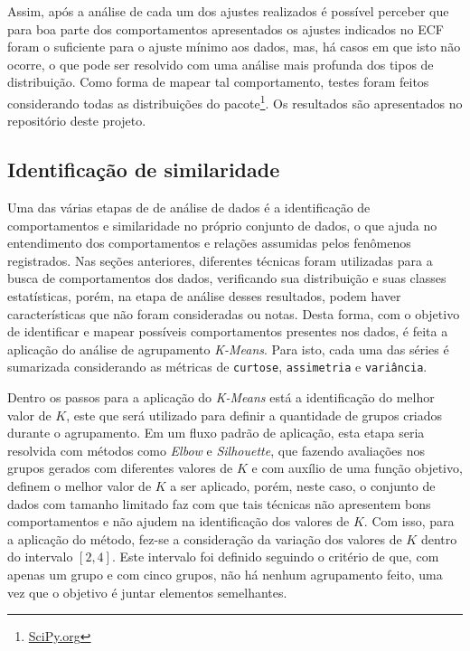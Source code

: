 \documentclass[a4paper,12pt]{article}
\begin{document}
\par Assim, após a análise de cada um dos ajustes realizados é possível perceber que para boa parte dos comportamentos apresentados os ajustes indicados no ECF foram o suficiente para o ajuste mínimo aos dados, mas, há casos em que isto não ocorre, o que pode ser resolvido com uma análise mais profunda dos tipos de distribuição. Como forma de mapear tal comportamento, testes foram feitos considerando todas as distribuições do pacote\footnote{\href{https://www.scipy.org/}{SciPy.org}}. Os resultados são apresentados no repositório deste projeto.

\subsection{Identificação de similaridade}

\par Uma das várias etapas de de análise de dados é a identificação de comportamentos e similaridade no próprio conjunto de dados, o que ajuda no entendimento dos comportamentos e relações assumidas pelos fenômenos registrados. Nas seções anteriores, diferentes técnicas foram utilizadas para a busca de comportamentos dos dados, verificando sua distribuição e suas classes estatísticas, porém, na etapa de análise desses resultados, podem haver características que não foram consideradas ou notas. Desta forma, com o objetivo de identificar e mapear possíveis comportamentos presentes nos dados, 
é feita a aplicação do análise de agrupamento \textit{K-Means}. Para isto, cada uma das séries é sumarizada considerando as métricas de \texttt{curtose}, \texttt{assimetria} e \texttt{variância}. 

\par Dentro os passos para a aplicação do \textit{K-Means} está a identificação do melhor valor de $K$, este que será utilizado para definir a quantidade de grupos criados durante o agrupamento. Em um fluxo padrão de aplicação, esta etapa seria resolvida com métodos como \textit{Elbow} e \textit{Silhouette}, que fazendo avaliações nos grupos gerados com diferentes valores de $K$ e com auxílio de uma função objetivo, definem o melhor valor de $K$ a ser aplicado, porém, neste caso, o conjunto de dados com tamanho limitado faz com que tais técnicas não apresentem bons comportamentos e não ajudem na identificação dos valores de $K$. Com isso, para a aplicação do método, fez-se a consideração da variação dos valores de $K$ dentro do intervalo $[2, 4]$. Este intervalo foi definido seguindo o critério de que, com apenas um grupo e com cinco grupos, não há nenhum agrupamento feito, uma vez que o objetivo é juntar elementos semelhantes.
\end{document}
